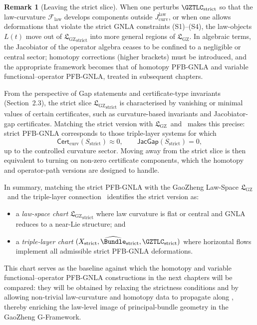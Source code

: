 \documentclass[11pt]{book}
\theoremstyle{plain}
\theoremstyle{definition}
\newtheorem{remark}[theorem]{Remark}
\newcommand{\GZLS}{\ensuremath{\mathfrak{L}_{\mathrm{GZ}}}}       \newcommand{\GZLT}{\ensuremath{M_{!w}}}                           \newcommand{\GZLOC}{\ensuremath{A_M}}                             \newcommand{\GZLCurv}{\ensuremath{\mathcal{F}_{\mathrm{law}}}}
\begin{document}
\begin{remark}[Leaving the strict slice]
When one perturbs $\GZTLC_{\mathrm{strict}}$ so that the law-curvature
  $\GZLCurv$ develops components outside $J_{\mathrm{curv}}^{\mathrm{law}}$,
  or when one allows deformations that violate the strict GNLA
  constraints (S1)–(S4), the law-objects $L(t)$ move out of
  ${\GZLS}_{\mathrm{strict}}$ into more general regions of \GZLS. In
  algebraic terms, the Jacobiator of the operator algebra ceases to be
  confined to a negligible or central sector; homotopy corrections
  (higher brackets) must be introduced, and the appropriate framework
  becomes that of homotopy PFB-GNLA and variable functional–operator
  PFB-GNLA, treated in subsequent chapters.
\end{remark}

From the perspective of Gap statements and certificate-type invariants
(Section~2.3), the strict slice ${\GZLS}_{\mathrm{strict}}$ is
characterised by vanishing or minimal values of certain certificates,
such as curvature-based invariants and Jacobiator-gap certificates.
Matching the strict version with \GZLS\ and \GZTLC\ makes this precise:
strict PFB-GNLA corresponds to those triple-layer systems for which
\[
   \mathsf{Cert}_{\mathrm{curv}}(S_{\mathrm{strict}}) \approx 0,
   \qquad
   \mathsf{JacGap}(S_{\mathrm{strict}}) = 0,
\]
up to the controlled curvature sector. Moving away from the strict
slice is then equivalent to turning on non-zero certificate components,
which the homotopy and operator-path versions are designed to handle.



\medskip

In summary, matching the strict PFB-GNLA with the GaoZheng Law-Space
\GZLS\ and the triple-layer connection \GZTLC\ identifies the strict
version as:

\begin{itemize}
  \item a \emph{law-space chart} ${\GZLS}_{\mathrm{strict}}$ where law
        curvature is flat or central and GNLA reduces to a near-Lie
        structure; and
  \item a \emph{triple-layer chart} $(X_{\mathrm{strict}},
        \widehat{\Bundle}_{\mathrm{strict}},\GZTLC_{\mathrm{strict}})$
        where horizontal flows implement all admissible strict
        PFB-GNLA deformations.
\end{itemize}

This chart serves as the baseline against which the homotopy and
variable functional–operator PFB-GNLA constructions in the next
chapters will be compared: they will be obtained by relaxing the
strictness conditions and by allowing non-trivial law-curvature and
homotopy data to propagate along \GZTLC, thereby enriching the law-level
image of principal-bundle geometry in the GaoZheng G-Framework.
\end{document}
